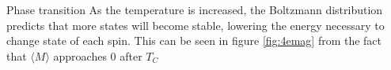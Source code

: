 









Phase transition
As the temperature is increased, the Boltzmann distribution predicts that more states will become stable, lowering the energy necessary to change state of each spin. This can be seen  in figure \ref{fig:4emag} from the fact that $ \langle M \rangle $ approaches 0 after $ T_C $